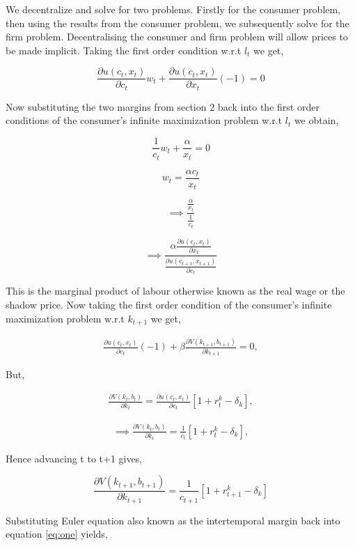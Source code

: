 \documentclass[
  11pt,
  justified]{article}
\begin{document}
We decentralize and solve for two problems. Firstly for the consumer
problem, then using the results from the consumer problem, we
subsequently solve for the firm problem. Decentralising the consumer and
firm problem will allow prices to be made implicit. Taking the first
order condition w.r.t \(l_t\) we get,

\[
\frac{\partial u(c_t, x_t)}{\partial c_t}  w_t + \frac{\partial u(c_t, x_t)}{\partial x_t}  (-1) = 0
\]

Now substituting the two margins from section 2 back into the first
order conditions of the consumer's infinite maximization problem w.r.t
\(l_t\) we obtain,

\[
\frac{1}{c_t} w_t + \frac{\alpha}{x_t} = 0
\]

\[
w_t = \frac{\alpha c_t}{x_t}
\]

\[
\implies \frac{\frac{\alpha}{x_t}}{\frac{1}{c_t}}
\]

\[
\implies \frac{\alpha \frac{\partial u(c_t, x_t)}{\partial x_t}}{ \frac{\partial u(c_{t+1}, x_{t+1})}{\partial c_{t}}}
\]

This is the marginal product of labour otherwise known as the real wage
or the shadow price. Now taking the first order condition of the
consumer's infinite maximization problem w.r.t \(k_{t+1}\) we get,

\begin{align}
\frac{\partial u(c_t, x_t)}{\partial c_t} (-1) + \beta \frac{\partial V(k_{t+1}, b_{t+1})}{\partial k_{t+1}} = 0, \tag{1} \label{eq:one}
\end{align}

But,

\begin{align}
\frac{\partial V(k_{t}, b_{t})}{\partial k_{t}} = \frac{\partial u(c_t, x_t)}{\partial c_t} [1 + r_t^k - \delta_k], \tag{by envelope condition}
\end{align}

\begin{align}
\implies \frac{\partial V(k_{t}, b_{t})}{\partial k_{t}} = \frac{1}{c_t} [1 + r_t^k - \delta_k], \tag{using the marginal utility (MU) of consumption}
\end{align}

Hence advancing t to t+1 gives,

\[
\frac{\partial V(k_{t+1}, b_{t+1})}{\partial k_{t+1}} =  \frac{1}{c_{t+1}} [1 + r_{t+1}^k - \delta_k]
\]

Substituting Euler equation also known as the intertemporal margin back
into equation \ref{eq:one} yields,
\end{document}
